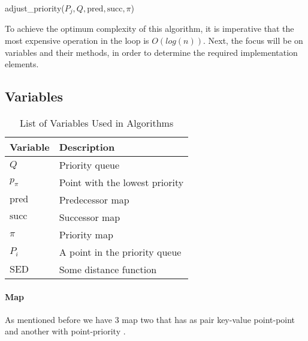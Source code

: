 \begin{algorithm}[H]
    \DontPrintSemicolon


    \caption{adjust\_priority($P_j, Q, \text{pred}, \text{succ}, \pi$)}
    \label{alg:adjust_priority}
\end{algorithm}


To achieve the optimum complexity of this algorithm, it is imperative that the most expensive operation in the loop is $O(log(n))$. Next, the focus will be on variables and their methods, in order to determine the required implementation elements.

\subsection{Variables}


\begin{table}[h!]
    \centering
    \label{tab:variables}
    \begin{tabular}{ll}
        \hline
        \textbf{Variable} & \textbf{Description} \\
        \hline
        $Q$             & Priority queue \\
        $p_{\pi}$       & Point with the lowest priority \\
        $\text{pred}$   & Predecessor map \\
        $\text{succ}$   & Successor map \\
        $\pi$           & Priority map \\
        $P_i$           & A point in the priority queue \\
        $\text{SED}$    & Some distance function \\
        \hline
    \end{tabular}
    \caption{List of Variables Used in Algorithms}
\end{table}

\paragraph{Map}

As mentioned before we have 3 map two that has as pair key-value point-point and another with point-priority .


